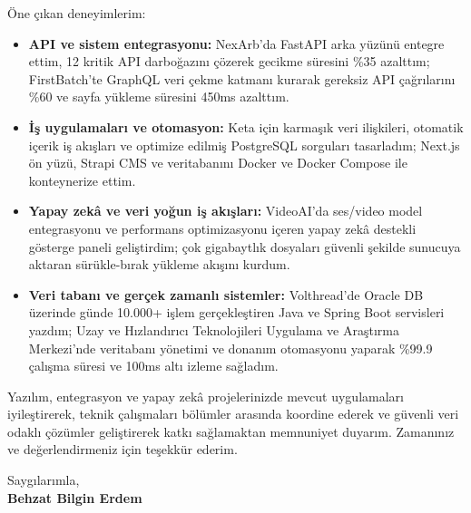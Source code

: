\documentclass[a4paper,11pt]{article}
\begin{document}
Öne çıkan deneyimlerim:
\begin{itemize}[leftmargin=*,itemsep=3pt,topsep=4pt]
  \item \textbf{API ve sistem entegrasyonu:} NexArb’da FastAPI arka yüzünü entegre ettim, 12 kritik API darboğazını çözerek gecikme süresini \%35 azalttım; FirstBatch’te GraphQL veri çekme katmanı kurarak gereksiz API çağrılarını \%60 ve sayfa yükleme süresini 450ms azalttım.
  \item \textbf{İş uygulamaları ve otomasyon:} Keta için karmaşık veri ilişkileri, otomatik içerik iş akışları ve optimize edilmiş PostgreSQL sorguları tasarladım; Next.js ön yüzü, Strapi CMS ve veritabanını Docker ve Docker Compose ile konteynerize ettim.
  \item \textbf{Yapay zekâ ve veri yoğun iş akışları:} VideoAI’da ses/video model entegrasyonu ve performans optimizasyonu içeren yapay zekâ destekli gösterge paneli geliştirdim; çok gigabaytlık dosyaları güvenli şekilde sunucuya aktaran sürükle-bırak yükleme akışını kurdum.
  \item \textbf{Veri tabanı ve gerçek zamanlı sistemler:} Volthread’de Oracle DB üzerinde günde 10.000+ işlem gerçekleştiren Java ve Spring Boot servisleri yazdım; Uzay ve Hızlandırıcı Teknolojileri Uygulama ve Araştırma Merkezi’nde veritabanı yönetimi ve donanım otomasyonu yaparak \%99.9 çalışma süresi ve 100ms altı izleme sağladım.
\end{itemize}

Yazılım, entegrasyon ve yapay zekâ projelerinizde mevcut uygulamaları iyileştirerek, teknik çalışmaları bölümler arasında koordine ederek ve güvenli veri odaklı çözümler geliştirerek katkı sağlamaktan memnuniyet duyarım. Zamanınız ve değerlendirmeniz için teşekkür ederim.

\vspace{16pt}

\noindent Saygılarımla,\\[6pt]
\textbf{Behzat Bilgin Erdem}
\end{document}
